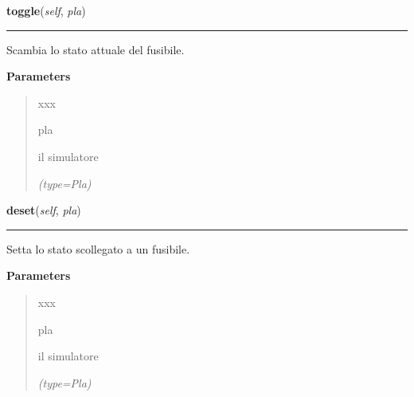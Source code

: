 \hspace{.8\funcindent}\begin{boxedminipage}{\funcwidth}

    \raggedright \textbf{toggle}(\textit{self}, \textit{pla})

    \vspace{-1.5ex}

    \rule{\textwidth}{0.5\fboxrule}
\setlength{\parskip}{2ex}
    Scambia lo stato attuale del fusibile.

\setlength{\parskip}{1ex}
      \textbf{Parameters}
      \vspace{-1ex}

      \begin{quote}
        \begin{Ventry}{xxx}

          \item[pla]

          il simulatore

            {\it (type=Pla)}

        \end{Ventry}

      \end{quote}

    \end{boxedminipage}

    \label{component:Fuse:deset}

    \vspace{0.5ex}

\hspace{.8\funcindent}\begin{boxedminipage}{\funcwidth}

    \raggedright \textbf{deset}(\textit{self}, \textit{pla})

    \vspace{-1.5ex}

    \rule{\textwidth}{0.5\fboxrule}
\setlength{\parskip}{2ex}
    Setta lo stato scollegato a un fusibile.

\setlength{\parskip}{1ex}
      \textbf{Parameters}
      \vspace{-1ex}

      \begin{quote}
        \begin{Ventry}{xxx}

          \item[pla]

          il simulatore

            {\it (type=Pla)}

        \end{Ventry}

      \end{quote}

    \end{boxedminipage}

